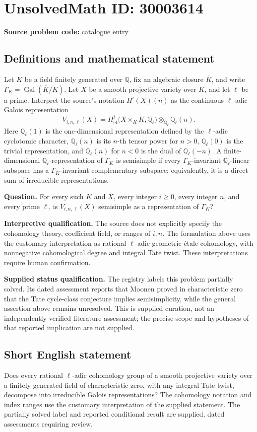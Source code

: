 \documentclass[11pt]{article}
\newcommand{\Q}{\mathbb{Q}}
\begin{document}
\section*{UnsolvedMath ID: 30003614}
\textbf{Source problem code:} catalogue entry
\subsection{Definitions and mathematical statement}
Let \(K\) be a field finitely generated over \(\Q\), fix an algebraic closure \(\overline K\), and write \(\Gamma_K=\operatorname{Gal}(\overline K/K)\). Let \(X\) be a smooth projective variety over \(K\), and let \(\ell\) be a prime. Interpret the source's notation \(H^i(X)(n)\) as the continuous \(\ell\)-adic Galois representation
\[
V_{i,n,\ell}(X)=H^i_{\mathrm{\acute et}}\bigl(X\times_K\overline K,\Q_\ell\bigr)\otimes_{\Q_\ell}\Q_\ell(n).
\]
Here \(\Q_\ell(1)\) is the one-dimensional representation defined by the \(\ell\)-adic cyclotomic character, \(\Q_\ell(n)\) is its \(n\)-th tensor power for \(n>0\), \(\Q_\ell(0)\) is the trivial representation, and \(\Q_\ell(n)\) for \(n<0\) is the dual of \(\Q_\ell(-n)\). A finite-dimensional \(\Q_\ell\)-representation of \(\Gamma_K\) is semisimple if every \(\Gamma_K\)-invariant \(\Q_\ell\)-linear subspace has a \(\Gamma_K\)-invariant complementary subspace; equivalently, it is a direct sum of irreducible representations.

\textbf{Question.} For every such \(K\) and \(X\), every integer \(i\geq 0\), every integer \(n\), and every prime \(\ell\), is \(V_{i,n,\ell}(X)\) semisimple as a representation of \(\Gamma_K\)?

\textbf{Interpretive qualification.} The source does not explicitly specify the cohomology theory, coefficient field, or ranges of \(i,n\). The formulation above uses the customary interpretation as rational \(\ell\)-adic geometric étale cohomology, with nonnegative cohomological degree and integral Tate twist. These interpretations require human confirmation.

\textbf{Supplied status qualification.} The registry labels this problem partially solved. Its dated assessment reports that Moonen proved in characteristic zero that the Tate cycle-class conjecture implies semisimplicity, while the general assertion above remains unresolved. This is supplied curation, not an independently verified literature assessment; the precise scope and hypotheses of that reported implication are not supplied.
\subsection{Short English statement}
Does every rational \(\ell\)-adic cohomology group of a smooth projective variety over a finitely generated field of characteristic zero, with any integral Tate twist, decompose into irreducible Galois representations? The cohomology notation and index ranges use the customary interpretation of the supplied statement. The partially solved label and reported conditional result are supplied, dated assessments requiring review.
\end{document}
